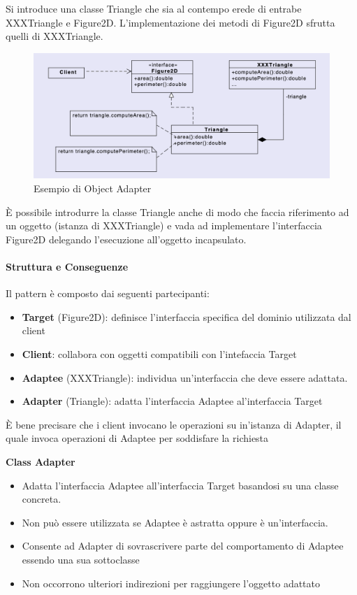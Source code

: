 Si introduce una classe Triangle che sia al contempo erede di entrabe XXXTriangle e Figure2D. L'implementazione dei metodi di Figure2D sfrutta quelli di XXXTriangle.

\begin{figure}[H]
    \centering
    \includegraphics[width=1\linewidth]{assets/pattern/adapter/object-adapter.png}
    \caption{Esempio di Object Adapter}
\end{figure}

È possibile introdurre la classe Triangle anche di modo che faccia riferimento ad un oggetto (istanza di XXXTriangle) e vada ad implementare l'interfaccia Figure2D delegando l'esecuzione all'oggetto incapsulato.

\paragraph{Struttura e Conseguenze} Il pattern è composto dai seguenti partecipanti:
\begin{itemize}
    \item \textbf{Target} (Figure2D): definisce l'interfaccia specifica del dominio utilizzata dal client
    \item \textbf{Client}: collabora con oggetti compatibili con l'intefaccia Target
    \item \textbf{Adaptee} (XXXTriangle): individua un'interfaccia che deve essere adattata.
    \item \textbf{Adapter} (Triangle): adatta l'interfaccia Adaptee al'interfaccia Target
\end{itemize}

È bene precisare che i client invocano le operazioni su in'istanza di Adapter, il quale invoca operazioni di Adaptee per soddisfare la richiesta

\textbf{Class Adapter}
\begin{itemize}
    \item Adatta l'interfaccia Adaptee all'interfaccia Target basandosi su una classe concreta.
    \item Non può essere utilizzata se Adaptee è astratta oppure è un'interfaccia.
    \item Consente ad Adapter di sovrascrivere parte del comportamento di Adaptee essendo una sua sottoclasse
    \item Non occorrono ulteriori indirezioni per raggiungere l'oggetto adattato
\end{itemize}

